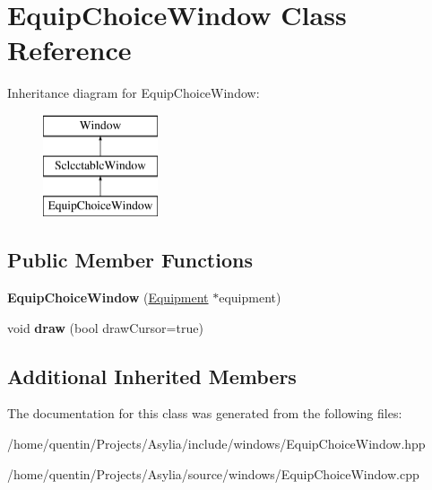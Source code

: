 \hypertarget{classEquipChoiceWindow}{\section{Equip\-Choice\-Window Class Reference}
\label{classEquipChoiceWindow}
}
Inheritance diagram for Equip\-Choice\-Window\-:\begin{figure}[H]
\begin{center}
\leavevmode
\includegraphics[height=3.000000cm]{classEquipChoiceWindow}
\end{center}
\end{figure}
\subsection*{Public Member Functions}
\begin{DoxyCompactItemize}
\item 
\hypertarget{classEquipChoiceWindow_a2799e91bd5b0ba538e083e60a0294b7e}{{\bfseries Equip\-Choice\-Window} (\hyperlink{classEquipment}{Equipment} $\ast$equipment)}\label{classEquipChoiceWindow_a2799e91bd5b0ba538e083e60a0294b7e}

\item 
\hypertarget{classEquipChoiceWindow_ac57b362baee4ceae21a3e01e1410aeca}{void {\bfseries draw} (bool draw\-Cursor=true)}\label{classEquipChoiceWindow_ac57b362baee4ceae21a3e01e1410aeca}

\end{DoxyCompactItemize}
\subsection*{Additional Inherited Members}


The documentation for this class was generated from the following files\-:\begin{DoxyCompactItemize}
\item 
/home/quentin/\-Projects/\-Asylia/include/windows/Equip\-Choice\-Window.\-hpp\item 
/home/quentin/\-Projects/\-Asylia/source/windows/Equip\-Choice\-Window.\-cpp\end{DoxyCompactItemize}
